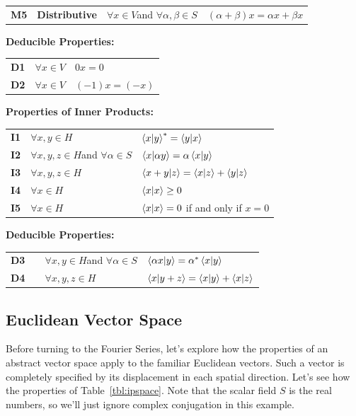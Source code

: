 \documentclass[12pt]{book}
\begin{document}
\begin{table}
\begin{center}
\begin{tabular}{llll}
  {\bf M5} & {\bf Distributive} & $\forall x \in V$and $\forall \alpha,\beta \in S$ & $ (\alpha + \beta)x = \alpha x + \beta x $ \\
\end{tabular}
\vskip 0.5cm
{\bf Deducible Properties:}\\
\begin{tabular}{lll}
{\bf D1}  & $\forall x \in V $  & $0x = 0$ \\
{\bf D2}  & $\forall x \in V $  & $(-1)x = (-x)$ \\
\end{tabular}
\vskip 0.5cm
{\bf Properties of Inner Products:}\\
\begin{tabular}{lll}
  {\bf I1} & $\forall x,y \in H$ & $\braket{x|y}^* = \braket{y|x}$\\
{\bf I2} & $\forall x,y,z \in H$and $\forall \alpha \in S$ &
$\braket{x|\alpha y} = \alpha \braket{x|y}$\\
{\bf I3} & $\forall x,y,z \in H$ & $\braket{x+y|z} = \braket{x|z}+\braket{y|z}$\\
{\bf I4} & $\forall x \in H$ & $\braket{x|x} \geq 0$ \\
{\bf I5} & $\forall x \in H$ & $\braket{x|x}=0$ if and only if $x=0$ \\
\end{tabular}
\vskip 0.5cm
{\bf Deducible Properties:}\\
\begin{tabular}{llll}
{\bf D3} & & $\forall x,y \in H$and $\forall \alpha \in S$ &
$\braket{\alpha x|y} = \alpha^* \braket{x|y}$\\
{\bf D4} & & $\forall x,y,z \in H$ &
$\braket{x|y+z} = \braket{x|y}+\braket{x|z}$\\
\end{tabular}
\end{center}
\end{table}

\subsection{Euclidean Vector Space}

Before turning to the Fourier Series, let's explore how the properties of an abstract vector space apply to the familiar Euclidean vectors.  Such a vector is completely specified by its displacement in each spatial direction.  Let's see how the properties of Table~\ref{tbl:ipspace}.  Note that the scalar field $S$ is the real numbers, so we'll just ignore complex conjugation in this example.
\end{document}
